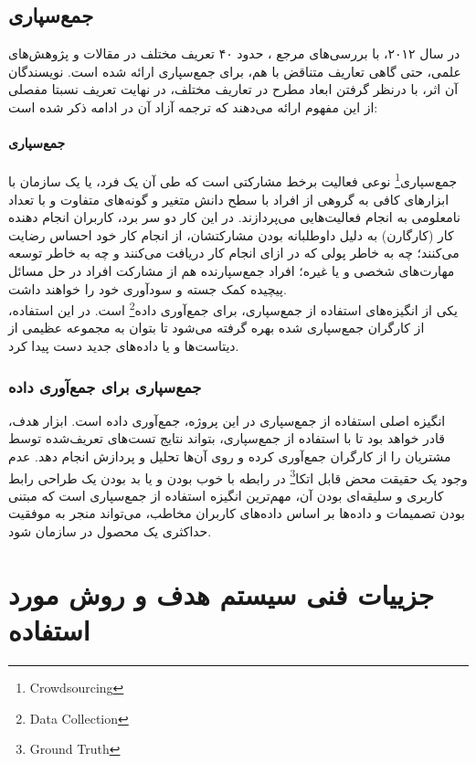 \documentclass{article}
\theoremstyle{definition}
\begin{document}
\subsection{جمع‌سپاری}
در سال ۲۰۱۲، با بررسی‌های مرجع 
\cite{estelle}
، حدود ۴۰ تعریف مختلف در مقالات و پژوهش‌های علمی، حتی گاهی تعاریف متناقض با هم، برای جمع‌سپاری ارائه شده است. نویسندگان آن اثر، با درنظر گرفتن ابعاد مطرح در تعاریف مختلف، در نهایت تعریف نسبتا مفصلی از این مفهوم ارائه می‌دهند که ترجمه آزاد آن در ادامه ذکر شده است: \\
\paragraph{جمع‌سپاری}
جمع‌سپاری\footnote{Crowdsourcing}
نوعی فعالیت برخط مشارکتی است که طی آن یک فرد، یا یک سازمان با ابزارهای کافی به گروهی از افراد با سطح دانش متغیر و گونه‌های متفاوت و با تعداد نامعلومی به انجام فعالیت‌هایی می‌پردازند. در این کار دو سر برد، کاربران انجام دهنده کار (کارگارن)  به دلیل داوطلبانه بودن مشارکتشان، از انجام کار خود احساس رضایت می‌کنند؛ چه به خاطر پولی که در ازای انجام کار دریافت می‌کنند و چه به خاطر توسعه مهارت‌های شخصی و یا غیره؛ افراد جمع‌سپارنده هم از مشارکت افراد در حل مسائل پیچیده کمک جسته و سودآوری خود را خواهند داشت. \\
یکی از انگیزه‌های استفاده از جمع‌سپاری، برای جمع‌آوری داده\footnote{Data Collection} است. در این استفاده، از کارگران جمع‌سپاری شده بهره گرفته می‌شود تا بتوان به مجموعه عظیمی از دیتاست‌ها و یا داده‌های جدید دست پیدا کرد.
\subsubsection{جمع‌سپاری برای جمع‌آوری داده}
انگیزه اصلی استفاده از جمع‌سپاری در این پروژه، جمع‌آوری داده است. ابزار هدف، قادر خواهد بود تا با استفاده از جمع‌سپاری، بتواند نتایج تست‌های تعریف‌شده توسط مشتریان را از کارگران جمع‌آوری کرده و روی آن‌ها تحلیل و پردازش انجام دهد. عدم وجود یک حقیقت محض قابل اتکا\footnote{Ground Truth} در رابطه با خوب بودن و یا بد بودن یک طراحی رابط کاربری و سلیقه‌ای بودن آن، مهم‌ترین انگیزه استفاده از جمع‌سپاری است که مبتنی بودن تصمیمات و داده‌ها بر اساس داده‌های کاربران مخاطب، می‌تواند منجر به موفقیت حداکثری یک محصول در سازمان شود.
\section{جزییات فنی سیستم هدف و روش مورد استفاده}
\end{document}
